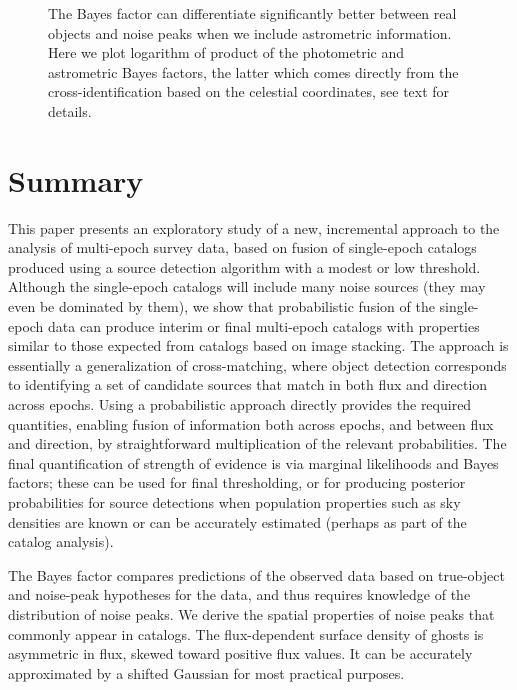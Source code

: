 \documentclass[twocolumn]{emulateapj}
\begin{document}
\begin{figure}[t!]
\caption{The Bayes factor can differentiate significantly better between real objects and noise peaks when we include astrometric information.
Here we plot logarithm of product of the photometric and astrometric Bayes factors, the latter which comes directly from the cross-identification based on the celestial coordinates, see text for details.}
\label{fig:bf2}
\end{figure}



\color{black}


\section{Summary}
\label{sec:sum}

\noindent
This paper presents an exploratory study of a new, incremental approach to the analysis of multi-epoch survey data, based on fusion of single-epoch catalogs produced using a source detection algorithm with a modest or low threshold.
Although the single-epoch catalogs will include many noise sources (they may even be dominated by them), we show that probabilistic fusion of the single-epoch data can produce interim or final multi-epoch catalogs with properties similar to those expected from catalogs based on image stacking.
The approach is essentially a generalization of cross-matching, where object detection corresponds to identifying a set of candidate sources that match in both flux and direction across epochs.
Using a probabilistic approach directly provides the required quantities, enabling fusion of information both across epochs, and between flux and direction, by straightforward multiplication of the relevant probabilities.
The final quantification of strength of evidence is via marginal likelihoods and Bayes factors; these can be used for final thresholding, or for producing posterior probabilities for source detections when population properties such as sky densities are known or can be accurately estimated (perhaps as part of the catalog analysis).

The Bayes factor compares predictions of the observed data based on true-object and noise-peak hypotheses for the data, and thus requires knowledge of the distribution of noise peaks.
We derive the spatial properties of noise peaks that commonly appear in catalogs.
The flux-dependent surface density of ghosts is asymmetric in flux, skewed toward positive flux values.
It can be accurately approximated by a shifted Gaussian for most practical purposes.
\end{document}
